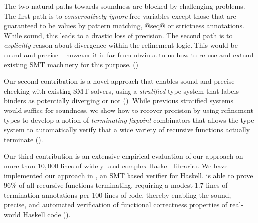 The two natural paths towards soundness are blocked by challenging problems.
%
The first path is to \emph{conservatively ignore} free variables 
except those that are guaranteed to be values \eg by pattern 
matching, @seq@ or strictness annotations.  
While sound, this leads to a drastic loss of precision. 
%
The second path is to \emph{explicitly} reason about divergence 
within the refinement logic. This would be sound and 
precise -- however it is far from obvious to us how 
to re-use and extend existing SMT machinery for 
this purpose. ()


Our second contribution is a novel approach that
enables sound and precise checking with existing 
SMT solvers, using a \emph{stratified} type system that 
labels binders as potentially diverging or not 
().
%
While previous stratified systems~\cite{ConstableS87}
would suffice for soundness, we show how to recover 
precision by using refinement types to develop a 
notion of \emph{terminating fixpoint} combinators 
that allows the type system to automatically 
verify that a wide variety of recursive functions 
actually terminate ().

Our third contribution is an extensive empirical
evaluation of our approach on more than $10,000$ 
lines of widely used complex Haskell libraries.
We have implemented our approach in \toolname, 
an SMT based verifier for Haskell. 
%
\toolname is able to prove 96\% of 
all recursive functions terminating, requiring a modest 
1.7 lines of termination annotations per 100 lines 
of code, thereby enabling the sound, precise, 
and automated verification of functional 
correctness properties of real-world Haskell code 
().



